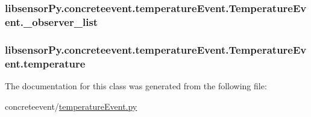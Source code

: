 \subsubsection[{\+\_\+observer\+\_\+list}]{\setlength{\rightskip}{0pt plus 5cm}libsensor\+Py.\+concreteevent.\+temperature\+Event.\+Temperature\+Event.\+\_\+observer\+\_\+list\hspace{0.3cm}{\ttfamily [private]}}\label{classlibsensorPy_1_1concreteevent_1_1temperatureEvent_1_1TemperatureEvent_ae91f23fb7443c5d65a8ff831beede09d}
\hypertarget{classlibsensorPy_1_1concreteevent_1_1temperatureEvent_1_1TemperatureEvent_a0990f7787cc7f43fe7faab4d9b2b1873}{}
\subsubsection[{temperature}]{\setlength{\rightskip}{0pt plus 5cm}libsensor\+Py.\+concreteevent.\+temperature\+Event.\+Temperature\+Event.\+temperature}\label{classlibsensorPy_1_1concreteevent_1_1temperatureEvent_1_1TemperatureEvent_a0990f7787cc7f43fe7faab4d9b2b1873}


The documentation for this class was generated from the following file\+:\begin{DoxyCompactItemize}
\item 
concreteevent/\hyperlink{temperatureEvent_8py}{temperature\+Event.\+py}\end{DoxyCompactItemize}
